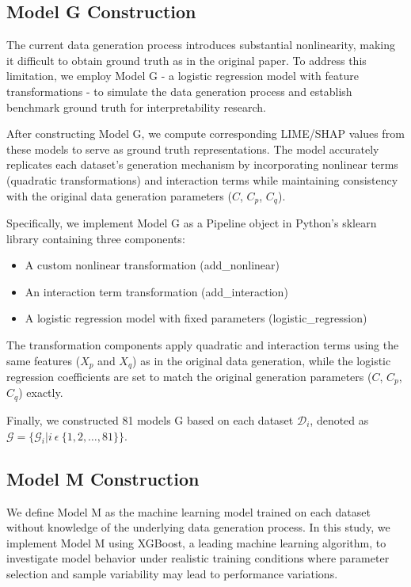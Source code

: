 \documentclass{article}
\begin{document}
\subsection{Model G Construction}

The current data generation process introduces substantial nonlinearity, making it difficult to obtain ground truth as in the original paper. To address this limitation, we employ Model G - a logistic regression model with feature transformations - to simulate the data generation process and establish benchmark ground truth for interpretability research.

After constructing Model G, we compute corresponding LIME/SHAP values from these models to serve as ground truth representations. The model accurately replicates each dataset's generation mechanism by incorporating nonlinear terms (quadratic transformations) and interaction terms while maintaining consistency with the original data generation parameters ($C$, $C_{p}$, $C_{q}$).

Specifically, we implement Model G as a Pipeline object in Python's sklearn library containing three components:

\begin{itemize}
    \item A custom nonlinear transformation (add\_nonlinear)
    \item An interaction term transformation (add\_interaction)
    \item A logistic regression model with fixed parameters (logistic\_regression)
\end{itemize}

The transformation components apply quadratic and interaction terms using the same features ($X_{p}$ and $X_{q}$) as in the original data generation, while the logistic regression coefficients are set to match the original generation parameters ($C$, $C_{p}$, $C_{q}$) exactly.

Finally, we constructed 81 models G based on each dataset $\mathcal{D}_{i}$, denoted as $\mathcal{G = \{}\mathcal{G}_{i}|i\ \epsilon\ \{ 1,2,\ldots,81\}\}$.

\subsection{Model M Construction}

We define Model M as the machine learning model trained on each dataset without knowledge of the underlying data generation process. In this study, we implement Model M using XGBoost, a leading machine learning algorithm, to investigate model behavior under realistic training conditions where parameter selection and sample variability may lead to performance variations.
\end{document}
